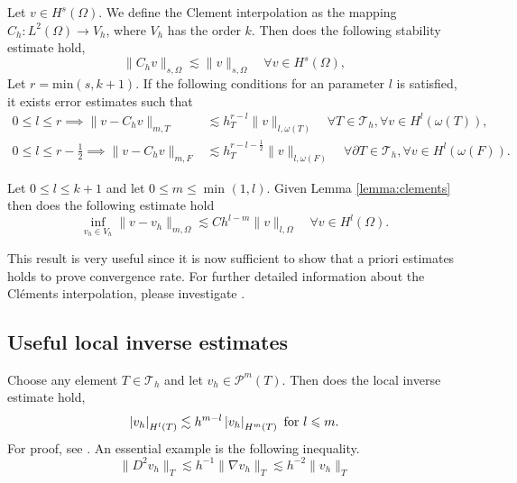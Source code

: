\begin{lemma}
    \label{lemma:clements}

    Let $v \in H^{s}( \Omega ) $. We define the Clement interpolation as the mapping
$C_{h}: L^{2}( \Omega )   \to  V_{h}$, where $V_{h}$ has the order $k$. Then does the following stability estimate hold,
\[
 \| C_{h} v \|_{ s, \Omega     }^{  } \lesssim \| v \|_{ s, \Omega   }^{  } \quad \forall v \in H^{s}( \Omega ) ,
\]
Let $r = \mathrm{min} ( s, k+1) $. If the following conditions for an parameter $l$ is satisfied, it exists error estimates such that
\begin{equation}
    \begin{split}
      0\le l \le r  \implies \| v - C_{h} v \|_{ m,T   }^{  }  &  \lesssim h^{r-l}_{T} \| v \|_{l,\omega \left( T \right)  }^{  } \quad  \forall T \in \mathcal{T} _{h}, \forall v \in H^{l}( \omega \left( T \right)
      ), \\
      0\le l \le r-\frac{1}{2}  \implies \| v - C_{h} v \|_{ m,F }^{  } & \lesssim h^{r - l - \frac{1}{2}}_{T} \| v \|_{l,\omega \left( F \right)  }^{  } \quad  \forall \partial T \in \mathcal{T} _{h}, \forall v \in H^{l}( \omega \left( F
      \right)).
    \end{split}
\end{equation}

\end{lemma}


\begin{corollary}
    \label{cor:celement_apriori}
    Let $0 \le l \le k+1$ and let $0\le m \le \min_{} ( 1,l )$.
    Given Lemma \ref{lemma:clements}  then does the following estimate hold
    \[
    \inf_{v_{h} \in V_{h} } \| v - v_{h} \|_{  m,\Omega }^{  } \lesssim  C h^{l-m}  \| v \|_{ l,\Omega  }^{  } \quad     \forall v \in H^{l}( \Omega ).
    \]
\end{corollary}
This result is very useful since it is now sufficient to show that a priori estimates holds to prove convergence rate. For further detailed information about the Cléments interpolation, please investigate \cite[Chapter 1.6]{ern04}.

\subsection{Useful local inverse estimates}%
\label{sub:some_general_inequalities}


    Choose any element $T \in \mathcal{T}_{h} $ and let $v_{h} \in \mathcal{P} ^{m}( T)   $. Then does the local inverse estimate hold,
\begin{equation}
\label{eq:inv1}
\left\lvert  v_{h}  \right\rvert_{H^{l}( T) }  \lesssim h^{m-l} \left\lvert  v_{h}  \right\rvert_{H^{m}( T  ) }
\text{ for } l \leqslant m.
\end{equation}
 For proof, see \cite[Lemma 12.1]{ErnGuermond2021}. An essential example is the following inequality.
 \begin{equation}
     \label{eq:degrade}
\| D^2v_{h} \|_{T  }^{  } \lesssim h^{-1} \| \nabla v_{h}  \|_{ T  }^{  } \lesssim h^{-2} \| v_{h} \|_{T  }^{  }
 \end{equation}

